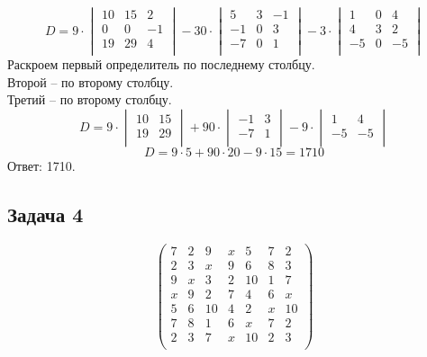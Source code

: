 	    \[
	    D =
	    9 \cdot
	    \begin{vmatrix}
	    10 & 15 & 2 \\
	    0 & 0 & -1 \\
	    19 & 29 & 4 \\
	    \end{vmatrix} 
	    - 30 \cdot 
	    \begin{vmatrix}
	    5 & 3 & -1 \\
	    -1 & 0 & 3 \\
	    -7 & 0 & 1 \\
	    \end{vmatrix}
	    -3 \cdot
	    \begin{vmatrix}
	    1 & 0 & 4 \\
	    4 & 3 & 2 \\
	    -5 & 0 & -5 \\
	    \end{vmatrix}
	    \]
	    Раскроем первый определитель по последнему столбцу.\\
	    Второй -- по второму столбцу.\\
	    Третий -- по второму столбцу.
	    \[
	    D =
	    9 \cdot
	    \begin{vmatrix}
	    10 & 15 \\
	    19 & 29 \\
	    \end{vmatrix} 
	    + 90 \cdot 
	    \begin{vmatrix}
	    -1 & 3 \\
	    -7 & 1 \\
	    \end{vmatrix}
	    - 9 \cdot
	    \begin{vmatrix}
	    1 & 4 \\
	    -5 & -5 \\
	    \end{vmatrix}
	    \]
	    \[
	    D =
	    9 \cdot 5
	    + 90 \cdot 20
	    - 9 \cdot 15 = 1710
	    \]
	    Ответ: 1710.
	    
	    \subsection{Задача 4}
	    
	    \[
	    \begin{pmatrix}
	    7 & 2 & 9 & x & 5 & 7 & 2 \\
	    2 & 3 & x & 9 & 6 & 8 & 3 \\
	    9 & x & 3 & 2 & 10 & 1 & 7 \\
	    x & 9 & 2 & 7 & 4 & 6 & x \\
	    5 & 6 & 10 & 4 & 2 & x & 10 \\
	    7 & 8 & 1 & 6 & x & 7 & 2 \\
	    2 & 3 & 7 & x & 10 & 2 & 3 \\
	    \end{pmatrix}
	    \]
	    
